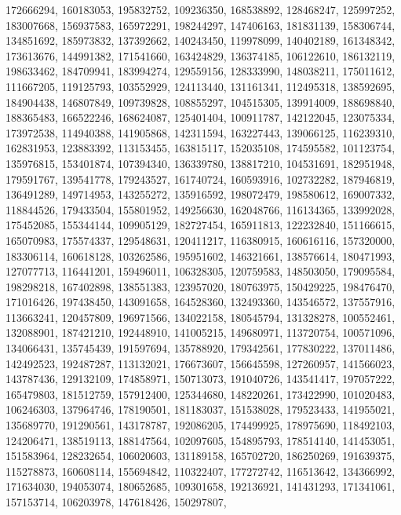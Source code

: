 {{    172666294, 160183053, 195832752, 109236350, 168538892, 128468247,
    125997252, 183007668, 156937583, 165972291, 198244297, 147406163,
    181831139, 158306744, 134851692, 185973832, 137392662, 140243450,
    119978099, 140402189, 161348342, 173613676, 144991382, 171541660,
    163424829, 136374185, 106122610, 186132119, 198633462, 184709941,
    183994274, 129559156, 128333990, 148038211, 175011612, 111667205,
    119125793, 103552929, 124113440, 131161341, 112495318, 138592695,
    184904438, 146807849, 109739828, 108855297, 104515305, 139914009,
    188698840, 188365483, 166522246, 168624087, 125401404, 100911787,
    142122045, 123075334, 173972538, 114940388, 141905868, 142311594,
    163227443, 139066125, 116239310, 162831953, 123883392, 113153455,
    163815117, 152035108, 174595582, 101123754, 135976815, 153401874,
    107394340, 136339780, 138817210, 104531691, 182951948, 179591767,
    139541778, 179243527, 161740724, 160593916, 102732282, 187946819,
    136491289, 149714953, 143255272, 135916592, 198072479, 198580612,
    169007332, 118844526, 179433504, 155801952, 149256630, 162048766,
    116134365, 133992028, 175452085, 155344144, 109905129, 182727454,
    165911813, 122232840, 151166615, 165070983, 175574337, 129548631,
    120411217, 116380915, 160616116, 157320000, 183306114, 160618128,
    103262586, 195951602, 146321661, 138576614, 180471993, 127077713,
    116441201, 159496011, 106328305, 120759583, 148503050, 179095584,
    198298218, 167402898, 138551383, 123957020, 180763975, 150429225,
    198476470, 171016426, 197438450, 143091658, 164528360, 132493360,
    143546572, 137557916, 113663241, 120457809, 196971566, 134022158,
    180545794, 131328278, 100552461, 132088901, 187421210, 192448910,
    141005215, 149680971, 113720754, 100571096, 134066431, 135745439,
    191597694, 135788920, 179342561, 177830222, 137011486, 142492523,
    192487287, 113132021, 176673607, 156645598, 127260957, 141566023,
    143787436, 129132109, 174858971, 150713073, 191040726, 143541417,
    197057222, 165479803, 181512759, 157912400, 125344680, 148220261,
    173422990, 101020483, 106246303, 137964746, 178190501, 181183037,
    151538028, 179523433, 141955021, 135689770, 191290561, 143178787,
    192086205, 174499925, 178975690, 118492103, 124206471, 138519113,
    188147564, 102097605, 154895793, 178514140, 141453051, 151583964,
    128232654, 106020603, 131189158, 165702720, 186250269, 191639375,
    115278873, 160608114, 155694842, 110322407, 177272742, 116513642,
    134366992, 171634030, 194053074, 180652685, 109301658, 192136921,
    141431293, 171341061, 157153714, 106203978, 147618426, 150297807,
}}
